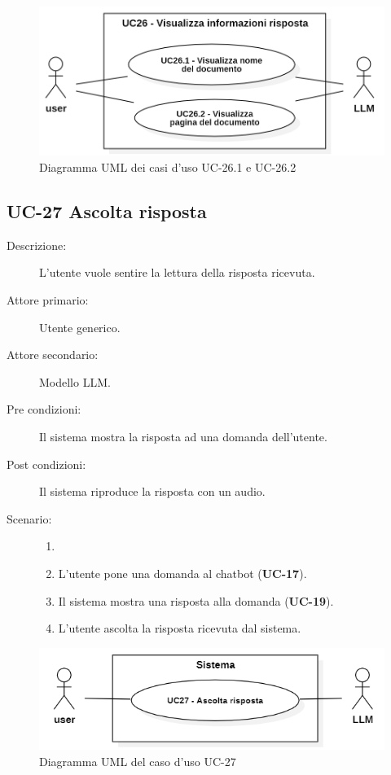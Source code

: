 \begin{figure}[H]
    \centering
    \includegraphics[width=0.9\linewidth]{UC26.1.PNG} 
    \caption{Diagramma UML dei casi d'uso UC-26.1 e UC-26.2}
\end{figure}

\subsection{UC-27 Ascolta risposta}
\begin{description}
    \item[Descrizione:] L'utente vuole sentire la lettura della risposta ricevuta.
    \item[Attore primario:] Utente generico.
    \item[Attore secondario:] Modello LLM.
    \item[Pre condizioni:] Il sistema mostra la risposta ad una domanda dell'utente.
    \item[Post condizioni:] Il sistema riproduce la risposta con un audio.
    \item[Scenario:]
    \begin{enumerate}
        \item[]
        \item L’utente pone una domanda al chatbot (\textbf{UC-17}).
        \item Il sistema mostra una risposta alla domanda (\textbf{UC-19}).
        \item L'utente ascolta la risposta ricevuta dal sistema.
    \end{enumerate}
\end{description}

\begin{figure}[H]
    \centering
    \includegraphics[width=0.9\linewidth]{UC27.png} 
    \caption{Diagramma UML del caso d'uso UC-27}
\end{figure}
